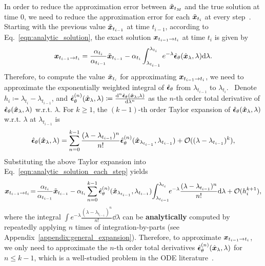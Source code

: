 In order to reduce the approximation error between $\tilde{\bm{x}}_{t_{M}}$ and the true solution at time $0$, we need to reduce the approximation error for each $\tilde{\bm{x}}_{t_i}$ at every step~\citep{atkinson2011numerical}. Starting with the previous value $\tilde{\bm{x}}_{t_{i-1}}$ at time $t_{i-1}$, according to Eq.~\eqref{eqn:analytic_solution}, the exact solution $\bm{x}_{t_{i-1} \to t_i} $ at time $t_{i}$ is given by
\begin{equation}
\label{eqn:analytic_solution_each_step}
    \bm{x}_{t_{i-1} \to t_i}  = \frac{\alpha_{t_i}}{\alpha_{t_{i-1}}} \tilde{\bm{x}}_{t_{i-1}} - \alpha_{t_i} \int_{\lambda_{t_{i-1}}}^{\lambda_{t_i}} e^{-\lambda} \hat{\bm{\epsilon}}_\theta(\hat{\bm{x}}_{\lambda}, \lambda)\dd\lambda.
\end{equation}
Therefore, to compute the value $\tilde{\bm{x}}_{t_i}$ for approximating $\bm{x}_{t_{i-1} \to t_i} $, we need to approximate the exponentially weighted integral of $\hat{\bm{\epsilon}}_\theta$ from $\lambda_{t_{i-1}}$ to $\lambda_{t_i}$.
~Denote $h_i\coloneqq \lambda_{t_i} - \lambda_{t_{i-1}}$, and $\hat{\bm{\epsilon}}_\theta^{(n)}(\hat{\bm{x}}_\lambda,\lambda)\coloneqq \frac{\dd^n \hat{\bm{\epsilon}}_\theta(\hat{\bm{x}}_\lambda,\lambda)}{\dd\lambda^n}$ as the $n$-th order total derivative of $\hat{\bm{\epsilon}}_\theta(\hat{\bm{x}}_\lambda, \lambda)$ w.r.t. $\lambda$. For $k\geq 1$, the $(k-1)$-th order Taylor expansion of $\hat{\bm{\epsilon}}_\theta(\hat{\bm{x}}_{\lambda},\lambda)$ w.r.t. $\lambda$ at $\lambda_{t_{i-1}}$ is
\begin{equation*}
    \hat{\bm{\epsilon}}_\theta(\hat{\bm{x}}_\lambda, \lambda) = \sum_{n=0}^{k-1} \frac{(\lambda - \lambda_{t_{i-1}})^n}{n!} \hat{\bm{\epsilon}}_\theta^{(n)}(\hat{\bm{x}}_{\lambda_{t_{i-1}}},\lambda_{t_{i-1}})+\mathcal O((\lambda - \lambda_{t_{i-1}})^{k}),
\end{equation*}
Substituting the above Taylor expansion into Eq.~\eqref{eqn:analytic_solution_each_step} yields
\begin{equation}
    \label{eqn:k-th-expansion}
    \bm{x}_{t_{i-1} \to t_i}\! =\! \frac{\alpha_{t_i}}{\alpha_{t_{i-1}}} \tilde{\bm{x}}_{t_{i-1}} - \alpha_{t_i} \sum_{n=0}^{k-1} \hat{\bm{\epsilon}}_\theta^{(n)}(\hat{\bm{x}}_{\lambda_{t_{i-1}}},\lambda_{t_{i-1}}) \!\int_{\lambda_{t_{i-1}}}^{\lambda_{t_i}}\!\! e^{-\lambda}  \frac{(\lambda - \lambda_{t_{i-1}})^n}{n!} \dd\lambda + \mathcal O(h_i^{k+1}),
\end{equation}
where the integral $\int e^{-\lambda}  \frac{(\lambda - \lambda_{t_{i-1}})^n}{n!} \dd\lambda$ can be \textbf{analytically} computed by repeatedly applying $n$ times of integration-by-parts (see Appendix~\ref{appendix:general_expansion}). Therefore, to approximate $\bm{x}_{t_{i-1} \to t_i}$, we only need to approximate the $n$-th order total derivatives $\hat{\bm{\epsilon}}_\theta^{(n)}(\hat{\bm{x}}_\lambda,\lambda)$ for $n\leq k-1$, which is a well-studied problem in the ODE literature~\citep{hochbruck2005explicit,luan2021efficient}.
